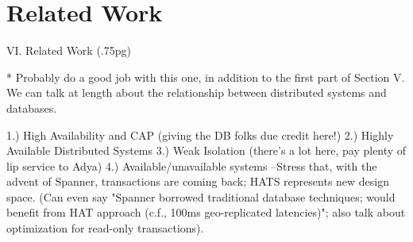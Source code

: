 
\section{Related Work}

VI. Related Work (.75pg)

* Probably do a good job with this one, in addition to the first part of Section V. We can talk at length about the relationship between distributed systems and databases.

1.) High Availability and CAP (giving the DB folks due credit here!)
2.) Highly Available Distributed Systems
3.) Weak Isolation (there's a lot here, pay plenty of lip service to Adya)
4.) Available/unavailable systems
	--Stress that, with the advent of Spanner, transactions are coming back; HATS represents new design space. (Can even say "Spanner borrowed traditional database techniques; would benefit from HAT approach (c.f., 100ms geo-replicated latencies)"; also talk about optimization for read-only transactions).
